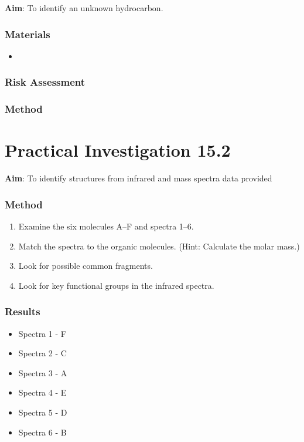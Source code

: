 \documentclass{report}
\begin{document}
	\textbf{Aim}: To identify an unknown hydrocarbon.

	\subsubsection{Materials}
	
		\begin{itemize}
			\item 
		\end{itemize}

	\subsubsection{Risk Assessment}
	
	\subsubsection{Method}
	
\section*{Practical Investigation 15.2}

	\textbf{Aim}: To identify structures from infrared and mass spectra data provided

	\subsubsection{Method}
	
		\begin{enumerate}
			\item Examine the six molecules A–F and spectra 1–6.
			\item Match the spectra to the organic molecules. (Hint: Calculate the molar mass.)
			\item Look for possible common fragments.
			\item Look for key functional groups in the infrared spectra.
		\end{enumerate}

	\subsubsection{Results}
	
		\begin{itemize}
			\item Spectra 1 - F
			\item Spectra 2 - C
			\item Spectra 3 - A
			\item Spectra 4 - E
			\item Spectra 5 - D
			\item Spectra 6 - B
		\end{itemize}
\end{document}
